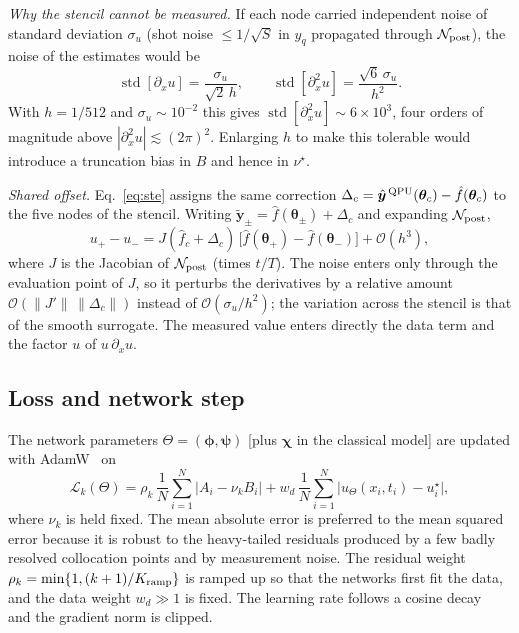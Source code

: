 \documentclass[floatfix,aps,pra,twocolumn,showpacs,superscriptaddress,10pt,nofootinbib]{revtex4-2}
\begin{document}
\begin{appendices}
\emph{Why the stencil cannot be measured.} If each node carried independent noise of standard deviation $\sigma_u$ (shot noise $\le1/\sqrt S$ in $y_q$ propagated through $\mathcal N_{\rm post}$), the noise of the estimates would be
\begin{equation}
  \operatorname{std}[\partial_xu]=\frac{\sigma_u}{\sqrt2\,h},\qquad \operatorname{std}[\partial_x^2u]=\frac{\sqrt6\,\sigma_u}{h^2}.
\end{equation}
With $h=1/512$ and $\sigma_u\sim10^{-2}$ this gives $\operatorname{std}[\partial_x^2u]\sim6\times10^3$, four orders of magnitude above $|\partial_x^2u|\lesssim(2\pi)^2$. Enlarging $h$ to make this tolerable would introduce a truncation bias in $B$ and hence in $\nu^\star$.

\emph{Shared offset.} Eq.~\eqref{eq:ste} assigns the same correction $\Delta_c=\hat{\bm y}^{\,\rm QPU}(\bm\theta_c)-\hat f(\bm\theta_c)$ to the five nodes of the stencil. Writing $\tilde{\bm y}_\pm=\hat f(\bm\theta_\pm)+\Delta_c$ and expanding $\mathcal N_{\rm post}$,
\begin{equation}
  u_+-u_-=J(\hat f_c+\Delta_c)\,\big[\hat f(\bm\theta_+)-\hat f(\bm\theta_-)\big]+\mathcal O(h^3),
\end{equation}
where $J$ is the Jacobian of $\mathcal N_{\rm post}$ (times $t/T$). The noise enters only through the evaluation point of $J$, so it perturbs the derivatives by a relative amount $\mathcal O(\|J'\|\,\|\Delta_c\|)$ instead of $\mathcal O(\sigma_u/h^2)$; the variation across the stencil is that of the smooth surrogate. The measured value enters directly the data term and the factor $u$ of $u\,\partial_xu$.

\subsection{Loss and network step}
The network parameters $\Theta=(\bm\phi,\bm\psi)$ [plus $\bm\chi$ in the classical model] are updated with AdamW~\cite{loshchilov2019decoupled} on
\begin{equation}
  \mathcal L_k(\Theta)=\rho_k\,\frac1N\sum_{i=1}^N\big|A_i-\nu_kB_i\big|+w_d\,\frac1N\sum_{i=1}^N\big|u_\Theta(x_i,t_i)-u^\star_i\big|,
  \label{eq:loss}
\end{equation}
where $\nu_k$ is held fixed. The mean absolute error is preferred to the mean squared error because it is robust to the heavy-tailed residuals produced by a few badly resolved collocation points and by measurement noise. The residual weight $\rho_k=\min\{1,(k+1)/K_{\rm ramp}\}$ is ramped up so that the networks first fit the data, and the data weight $w_d\gg1$ is fixed. The learning rate follows a cosine decay~\cite{loshchilov2017sgdr} and the gradient norm is clipped.


\end{appendices}
\end{document}
